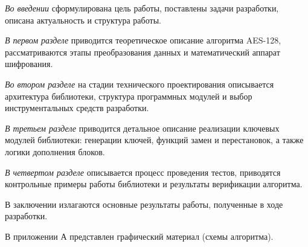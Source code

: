 \emph{Во введении} сформулирована цель работы, поставлены задачи разработки, описана актуальность и структура работы.

\emph{В первом разделе} приводится теоретическое описание алгоритма AES-128, рассматриваются этапы преобразования данных и математический аппарат шифрования.

\emph{Во втором разделе} на стадии технического проектирования описывается архитектура библиотеки, структура программных модулей и выбор инструментальных средств разработки.

\emph{В третьем разделе} приводится детальное описание реализации ключевых модулей библиотеки: генерации ключей, функций замен и перестановок, а также логики дополнения блоков.

\emph{В четвертом разделе} описывается процесс проведения тестов, приводятся контрольные примеры работы библиотеки и результаты верификации алгоритма.

В заключении излагаются основные результаты работы, полученные в ходе разработки.

В приложении А представлен графический материал (схемы алгоритма).